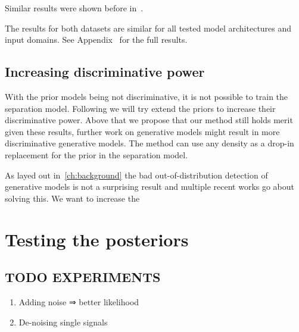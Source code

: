 Similar results were shown before in~.

The results for both datasets are similar for all tested model architectures and input domains. See Appendix~ for the full results.

\subsection{Increasing discriminative power}
With the prior models being not discriminative, it is not possible to train the separation model. Following we will try extend the priors to increase their discriminative power. Above that we propose that our method still holds merit given these results, further work on generative models might result in more discriminative generative models. The method can use any density as a drop-in replacement for the prior in the separation model.

As layed out in~\ref{ch:background} the bad out-of-distribution detection of generative models is not a surprising result and multiple recent works go about solving this. We want to increase the


\section{Testing the posteriors}

\subsection{TODO EXPERIMENTS}
\begin{enumerate}
    \item Adding noise ⇒ better likelihood
    \item De-noising single signals
\end{enumerate}
